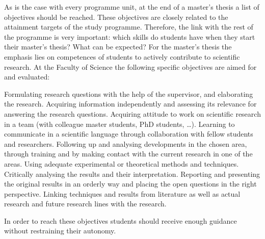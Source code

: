 As is the case with every programme unit, at the end of a master’s thesis a list of objectives should be reached. These objectives are closely related to the attainment targets of the study programme. Therefore, the link with the rest of the programme is very important: which skills do students have when they start their master’s thesis? What can be expected?
For the master’s thesis the emphasis lies on competences of students to actively contribute to scientific research. At the Faculty of Science the following specific objectives are aimed for and evaluated:

    Formulating research questions with the help of the supervisor, and elaborating the research.
    Acquiring information independently and assessing its relevance for answering the research questions.
    Acquiring attitude to work on scientific research in a team (with colleague master students, PhD students, …).
    Learning to communicate in a scientific language through collaboration with fellow students and researchers.
    Following up and analysing developments in the chosen area, through training and by making contact with the current research in one of the areas.
    Using adequate experimental or theoretical methods and techniques.
    Critically analysing the results and their interpretation.
    Reporting and presenting the original results in an orderly way and placing the open questions in the right perspective. Linking techniques and results from literature as well as actual research and future research lines with the research.
     

In order to reach these objectives students should receive enough guidance without restraining their autonomy.